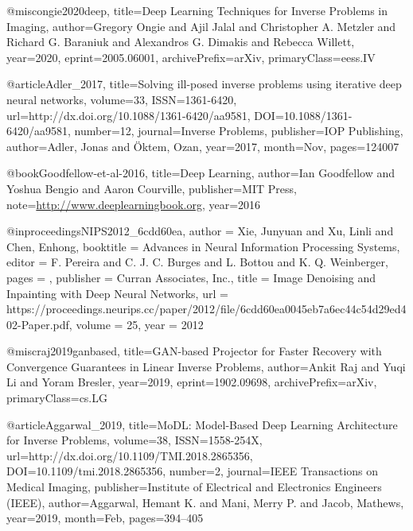 @misc{ongie2020deep,
      title={Deep Learning Techniques for Inverse Problems in Imaging}, 
      author={Gregory Ongie and Ajil Jalal and Christopher A. Metzler and Richard G. Baraniuk and Alexandros G. Dimakis and Rebecca Willett},
      year={2020},
      eprint={2005.06001},
      archivePrefix={arXiv},
      primaryClass={eess.IV}
}

@article{Adler_2017,
   title={Solving ill-posed inverse problems using iterative deep neural networks},
   volume={33},
   ISSN={1361-6420},
   url={http://dx.doi.org/10.1088/1361-6420/aa9581},
   DOI={10.1088/1361-6420/aa9581},
   number={12},
   journal={Inverse Problems},
   publisher={IOP Publishing},
   author={Adler, Jonas and Öktem, Ozan},
   year={2017},
   month={Nov},
   pages={124007}
}

@book{Goodfellow-et-al-2016,
    title={Deep Learning},
    author={Ian Goodfellow and Yoshua Bengio and Aaron Courville},
    publisher={MIT Press},
    note={\url{http://www.deeplearningbook.org}},
    year={2016}
}

@inproceedings{NIPS2012_6cdd60ea,
	author = {Xie, Junyuan and Xu, Linli and Chen, Enhong},
	booktitle = {Advances in Neural Information Processing Systems},
	editor = {F. Pereira and C. J. C. Burges and L. Bottou and K. Q. Weinberger},
	pages = {},
	publisher = {Curran Associates, Inc.},
	title = {Image Denoising and Inpainting with Deep Neural Networks},
	url = {https://proceedings.neurips.cc/paper/2012/file/6cdd60ea0045eb7a6ec44c54d29ed402-Paper.pdf},
	volume = {25},
	year = {2012}
}

@misc{raj2019ganbased,
	title={GAN-based Projector for Faster Recovery with Convergence Guarantees in Linear Inverse Problems}, 
	author={Ankit Raj and Yuqi Li and Yoram Bresler},
	year={2019},
	eprint={1902.09698},
	archivePrefix={arXiv},
	primaryClass={cs.LG}
}

@article{Aggarwal_2019,
	title={MoDL: Model-Based Deep Learning Architecture for Inverse Problems},
	volume={38},
	ISSN={1558-254X},
	url={http://dx.doi.org/10.1109/TMI.2018.2865356},
	DOI={10.1109/tmi.2018.2865356},
	number={2},
	journal={IEEE Transactions on Medical Imaging},
	publisher={Institute of Electrical and Electronics Engineers (IEEE)},
	author={Aggarwal, Hemant K. and Mani, Merry P. and Jacob, Mathews},
	year={2019},
	month={Feb},
	pages={394–405}
}

